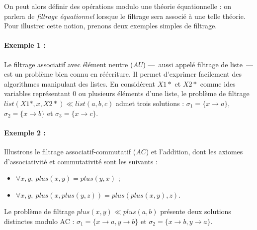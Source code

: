 On peut alors définir des opérations modulo une théorie équationnelle : on
parlera de \emph{filtrage équationnel} lorsque le filtrage sera associé à une
telle théorie. Pour illustrer cette notion, prenons deux exemples simples de
filtrage.

\paragraph{Exemple 1 :} Le filtrage associatif avec élément neutre ($AU$)
---~aussi appelé filtrage de liste~--- est un problème bien connu en
réécriture. Il permet d'exprimer facilement des algorithmes manipulant des
listes. En considérent $X1*$ et $X2*$ comme ides variables représentant 0 ou
plusieurs éléments d'une liste, le problème de filtrage $list(X1*,x,X2*) \ll
list(a,b,c)$ admet trois solutions : $\sigma_1 = \{ x\rightarrow a\}$,
$\sigma_2 = \{ x\rightarrow b\}$ et $\sigma_3 = \{ x\rightarrow c\}$.



\paragraph{Exemple 2 :} Illustrons le filtrage associatif-commutatif ($AC$) et
l'addition, dont les axiomes d'associativité et commutativité sont les suivants
:
\begin{itemize}
  \item $\forall x,y,~ plus(x,y) = plus(y,x)$ ;
  \item $\forall x,y,~ plus(x,plus(y,z))=plus(plus(x,y),z)$.
\end{itemize}
Le problème de filtrage $plus(x,y) \ll plus(a,b)$ présente deux solutions
distinctes modulo AC : $\sigma_1 = \{ x\rightarrow a,y\rightarrow b\}$ et
$\sigma_2=\{ x\rightarrow b, y\rightarrow a\}$.

